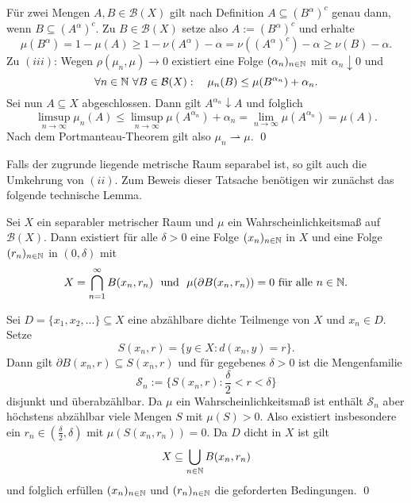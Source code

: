 \begin{proof*}
$$    $$
    Für zwei Mengen $A,B \in \mathcal{B}(X)$ gilt nach Definition $A \subseteq (B^{\alpha})^c$ genau dann, wenn $B \subseteq (A^{\alpha})^c$. 
    Zu $B \in \mathcal{B}(X)$ setze also $A:=(B^{\alpha})^c$ und erhalte 
    $$ 
        \mu(B^{\alpha}) = 1 - \mu(A) \geq 1 - \nu(A^{\alpha}) - \alpha = \nu((A^{\alpha})^c) - \alpha \geq \nu(B) - \alpha. 
    $$
    Zu $(iii)$: Wegen $\rho(\mu_n, \mu) \to 0$ existiert eine Folge $(\alpha_n)_{n \in \mathbb{N}}$ mit $\alpha_n \downarrow 0$ und 
    $$
        \forall n \in \mathbb{N} \ \forall B \in \mathcal{B}(X): \quad \mu_n(B) \leq \mu(B^{\alpha_n}) + \alpha_n. 
    $$
    Sei nun $A \subseteq X$ abgeschlossen. Dann gilt $A^{\alpha_n} \downarrow A$ und folglich
    $$
        \limsup_{n \to \infty} \mu_n(A) \leq \limsup_{n \to \infty} \mu(A^{\alpha_n}) + \alpha_n = \lim_{n \to \infty} \mu(A^{\alpha_n}) = \mu(A). 
    $$
    Nach dem Portmanteau-Theorem gilt also $\mu_n \rightharpoonup \mu$. 
    \qed
\end{proof*}
Falls der zugrunde liegende metrische Raum separabel ist, so gilt auch die Umkehrung von $(ii)$. Zum Beweis dieser Tatsache benötigen wir zunächst das folgende technische Lemma. 
\begin{lemma}
    Sei $X$ ein separabler metrischer Raum und $\mu$ ein Wahrscheinlichkeitsmaß auf $\mathcal{B}(X)$. Dann existiert für alle $\delta > 0$ eine Folge $(x_n)_{n \in \mathbb{N}}$ in $X$ und eine Folge $(r_n)_{n \in \mathbb{N}}$ in $(0, \delta)$ mit 
         $$
         X = \bigcap_{n=1}^{\infty}B(x_n, r_n) \ \text{ und } \ \mu(\partial B(x_n, r_n)) = 0 \text{ für alle }n \in \N.
         $$  
\end{lemma}
\begin{proof*}%
    Sei $D = \{x_1, x_2,... \} \subseteq X$ eine abzählbare dichte Teilmenge von $X$ und $x_n \in D$. Setze 
    $$
        S(x_n,r) = \{y \in X: d(x_n,y) = r\}.
    $$
    Dann gilt $\partial B(x_n,r) \subseteq S(x_n,r)$ und für gegebenes $\delta > 0$ ist die Mengenfamilie
    $$
        \mathcal{S}_n := \{S(x_n,r) : \frac{\delta}{2} < r < \delta \}
    $$
    disjunkt und überabzählbar. Da $\mu$ ein Wahrscheinlichkeitsmaß ist enthält $\mathcal{S}_n$ aber höchstens abzählbar viele Mengen $S$ mit $\mu(S) > 0$. 
    Also existiert insbesondere ein $r_n \in (\frac{\delta}{2}, \delta)$ mit $\mu(S(x_n,r_n)) = 0$. Da $D$ dicht in $X$ ist gilt 
    $$
        X \subseteq \bigcup_{n \in  \mathbb{N}}B(x_n, r_n)
    $$
    und folglich erfüllen $(x_n)_{n \in \mathbb{N}}$ und $(r_n)_{n \in \mathbb{N}}$ die geforderten Bedingungen. \qed
\end{proof*}

